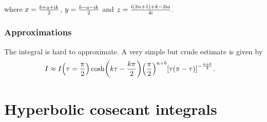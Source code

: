 \documentclass[english, parskip=full]{scrartcl}
\begin{document}
where $x=\frac{b+a+\text{i} k}{2}$, $y=\frac{b-a-\text{i} k}{2}$ and $z=\frac{\text{i} (2n+1) + k - 2\text{i} a}{4\text{i}}$. 
\subsubsection{Approximations}
The integral is hard to approximate.
A very simple but crude estimate is given by
\begin{align}
I &\approx I\kla*{\tau = \frac{\pi}{2}} \cosh\kla*{k\tau - \frac{k\pi}{2}} \kla*{\frac{\pi}{2}}^{a+b} \klb*{\tau \kla*{\pi - \tau}}^{-\frac{a+b}{2}}.
\end{align}
\section{Hyperbolic cosecant integrals}
\end{document}
